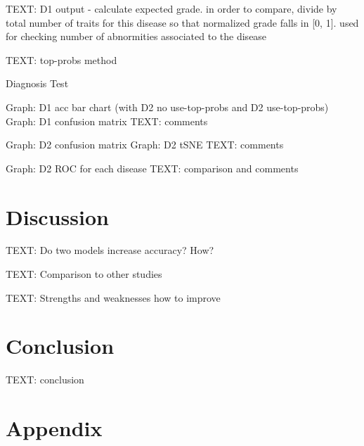 \documentclass{article}
\begin{document}
			TEXT: D1 output - calculate expected grade. in order to compare, divide by total number of traits for this disease so that normalized grade falls in [0, 1]. 
			used for checking number of abnormities associated to the disease
			
			TEXT: top-probs method
			
			\begin{table}[htbp]
				\centering
				\caption{Diagnosis Test}
				\label{tb:diagnosis_test}
			\end{table}
			
			Graph: D1 acc bar chart (with D2 no use-top-probs and D2 use-top-probs)
			Graph: D1 confusion matrix
			TEXT: comments
			
			Graph: D2 confusion matrix
			Graph: D2 tSNE
			TEXT: comments
			
			Graph: D2 ROC for each disease
			TEXT: comparison and comments
	
	\section{Discussion}
		
		TEXT: Do two models increase accuracy? How?
		
		TEXT: Comparison to other studies
		
		TEXT: Strengths and weaknesses
		how to improve
		
	\section{Conclusion}
	
		TEXT: conclusion

	\newrefcontext[sorting=nyt]
	\printbibliography
	
	\pagebreak
	\section*{Appendix}
	
\end{document}
